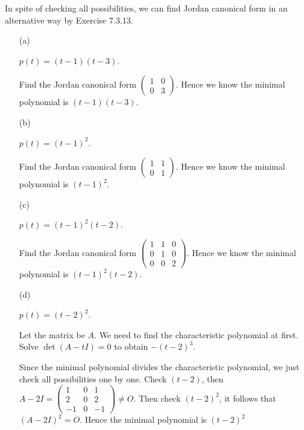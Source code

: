 \begin{Exercise}
	In spite of checking all possibilities, we can find Jordan canonical form in an alternative way by Exercise 7.3.13.
	\begin{enumerate}[(a)]
		\item[(a)]
		\begin{answer}
			$p(t) = (t-1)(t-3)$. 	
		\end{answer}
		\begin{solution}
			Find the Jordan canonical form $\begin{pmatrix}
			1 & 0 \\
			0 & 3
			\end{pmatrix}$.
			Hence we know the minimal polynomial is $(t-1)(t-3)$.
		\end{solution}
		
		\item[(b)]
		\begin{answer}
			$p(t) = (t-1)^2$. 	
		\end{answer}
		\begin{solution}	
			Find the Jordan canonical form $\begin{pmatrix}
			1 & 1 \\
			0 & 1
			\end{pmatrix}$.
			Hence we know the minimal polynomial is $(t-1)^2$.
		\end{solution}
		
		\item[(c)]
		\begin{answer}
			$p(t) = (t-1)^2(t-2)$. 	
		\end{answer}
		\begin{solution}
			Find the Jordan canonical form $\begin{pmatrix}
			1 & 1 & 0 \\
			0 & 1 & 0 \\
			0 & 0 & 2
			\end{pmatrix}$.
			Hence we know the minimal polynomial is $(t-1)^2(t-2)$.
		\end{solution}
		\item[(d)]
		\begin{answer}
			$p(t) = (t-2)^2$.
		\end{answer}
		\begin{solution}
			Let the matrix be $A$.
			We need to find the characteristic polynomial at first.
			Solve $\det(A-t I)= 0$ to obtain $-(t-2)^3$.
			
			Since the minimal polynomial divides the characteristic polynomial, we just check all possibilities one by one.
			Check $(t-2)$, then $A-2I = \begin{pmatrix}
			1 & 0 & 1 \\
			2 & 0 & 2 \\
			-1 & 0 & -1
			\end{pmatrix} \neq O$. Then check $(t-2)^2$, it follows that $(A-2I)^2 = O$. Hence the minimal polynomial is $(t-2)^2$
		\end{solution}
	\end{enumerate}
\end{Exercise} 